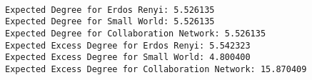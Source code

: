 \documentclass[11pt]{article}
\begin{document}
    \begin{center}
    \end{center}
    { \hspace*{\fill} \\}
    
    \begin{Verbatim}[commandchars=\\\{\}]
Expected Degree for Erdos Renyi: 5.526135
Expected Degree for Small World: 5.526135
Expected Degree for Collaboration Network: 5.526135
Expected Excess Degree for Erdos Renyi: 5.542323
Expected Excess Degree for Small World: 4.800400
Expected Excess Degree for Collaboration Network: 15.870409

    \end{Verbatim}
\end{document}
